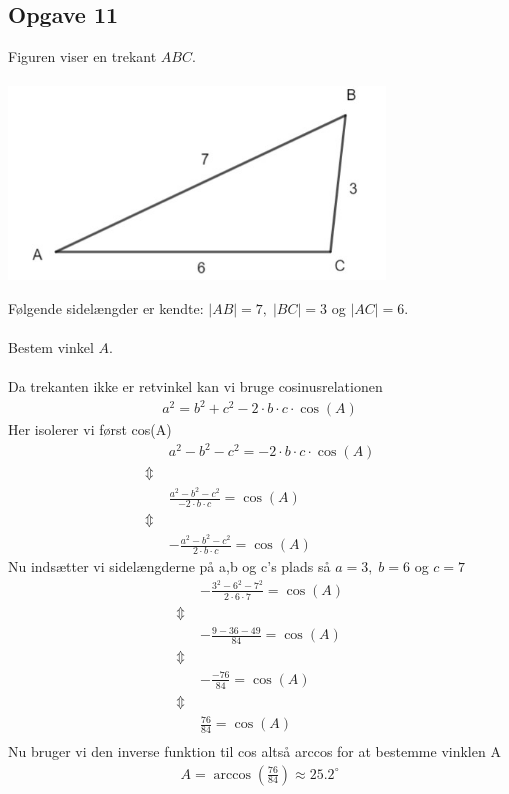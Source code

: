 \subsection{Opgave 11}
Figuren viser en trekant $ABC$.\\\\
\includegraphics[width=10cm]{Opgave_11-20/Opgave_11/Opgave_11.jpg}

Følgende sidelængder er kendte: $|AB| = 7,\; |BC| = 3$ og  $|AC| = 6$.\\\\
Bestem vinkel $A$.\\\\


\ans
Da trekanten ikke er retvinkel kan vi bruge cosinusrelationen
\begin{align*}
    a^2 = b^2 + c^2 -2\cdot b\cdot c\cdot \cos(A)
\end{align*}
Her isolerer vi først cos(A)
\begin{align*}
    &a^2 -b^2 - c^2 = -2\cdot b\cdot c\cdot \cos(A)\\
    \Updownarrow \; &\\
    &\frac{a^2 - b^2 - c^2}{-2\cdot b\cdot c} = \cos(A)\\
    \Updownarrow \; &\\
    &-\frac{a^2 - b^2 - c^2}{2\cdot b\cdot c} = \cos(A)
\end{align*}
Nu indsætter vi sidelængderne på a,b og c's plads så $a = 3,\; b = 6$ og $c = 7$
\begin{align*}
    &-\frac{3^2 - 6^2 - 7^2}{2\cdot 6\cdot 7} = \cos(A)\\
    \Updownarrow \; &\\
    &-\frac{9 - 36 - 49}{84} = \cos(A)\\
    \Updownarrow \; &\\
    &-\frac{-76}{84} =  \cos(A)\\
    \Updownarrow \; &\\
    &\frac{76}{84} = \cos(A)\\
\end{align*}
Nu bruger vi den inverse funktion til cos altså arccos for at bestemme vinklen A
\begin{align*}
    A = \arccos\left(\frac{76}{84}\right) \approx 25.2 ^{\circ}
\end{align*}